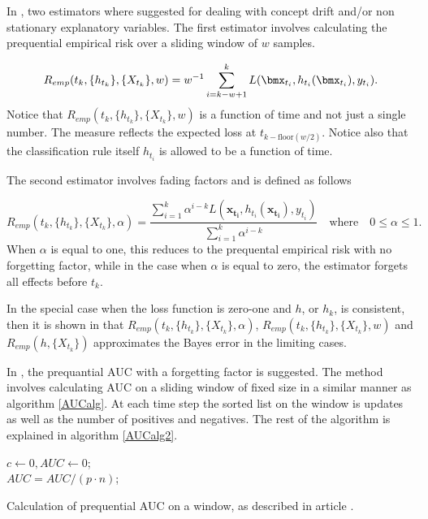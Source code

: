 In \cite{Gam13}, two estimators where suggested for dealing with concept drift and/or non stationary explanatory variables.  The first estimator involves calculating the prequential empirical risk over a sliding window of $w$ samples. 

\begin{equation}
\label{eq:prequentialRisk2}
R_{emp}(t_k, \{h_{t_k}\}, \{X_{t_k}\}, w) = w^{-1} \sum_{i=k - w +1}^k L(\bmx_{t_i} , h_{t_i}(\bmx_{t_i} ), y_{t_i}).
\end{equation}
Notice that $R_{emp}(t_k, \{h_{t_k}\}, \{X_{t_k}\}, w)$ is a function of time and not just a single number.  The measure reflects the expected loss at $t_{k-\mbox{floor}(w/2)}$.  Notice also that the classification rule itself $h_{t_i}$ is allowed to be a function of time.

The second estimator involves fading factors and is defined as follows

\begin{equation}
\label{eq:prequentialRisk3}
R_{emp}(t_k, \{h_{t_k}\}, \{X_{t_k}\}, \alpha) =\frac{\sum_{i=1}^k \alpha^{i-k}L(\bm{x_{t_i}} , h_{t_i}(\bm{x_{t_i}} ), y_{t_i})}{\sum_{i=1}^k \alpha^{i-k}} \quad \mbox{where} \quad 0 \leq \alpha \leq 1.
\end{equation}
When $\alpha$ is equal to one, this reduces to the prequental empirical risk with no forgetting factor, while in the case when $\alpha$ is equal to zero, the estimator forgets all effects before $t_k$.

In the special case when the loss function is zero-one and $h$, or $h_k$, is consistent, then it is shown in \cite{Gam13} that 
$R_{emp}(t_k, \{h_{t_k}\}, \{X_{t_k}\}, \alpha)$, $R_{emp}(t_k, \{h_{t_k}\}, \{X_{t_k}\}, w) $ and $R_{emp}(h, \{X_{t_k}\})$ approximates the Bayes error in the limiting cases.


In \cite{Brz14}, the prequantial AUC with a forgetting factor is suggested.  The method involves calculating AUC on a sliding window of fixed size in a similar manner as algorithm \ref{AUCalg}.  At each time step the sorted list on the window is updates as well as the number of positives and negatives.  The rest of the algorithm is explained in algorithm \ref{AUCalg2}.


\begin{algorithm}[H]
$c \leftarrow 0, AUC \leftarrow 0$;\\
$ AUC = AUC/(p \cdot n)$;
\label{AUCalg2}
 \caption{Calculation of prequential AUC on a window, as described in article \cite{Brz14}.}
\end{algorithm}


